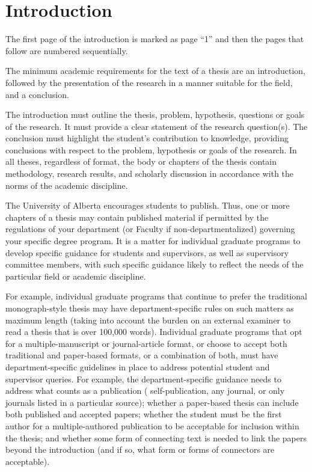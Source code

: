 
\chapter{Introduction}\label{ch:Introduction}
  The first page of the introduction is marked as page ``1'' and then the pages that follow are numbered sequentially.

  The minimum academic requirements for the text of a thesis are an introduction, followed by the presentation of the research in a manner suitable for the field, and a conclusion.

  The introduction must outline the thesis, problem, hypothesis, questions or goals of the research.
  It must provide a clear statement of the research question(s).
  The conclusion must highlight the student’s contribution to knowledge, providing conclusions with respect to the problem, hypothesis or goals of the research.
  In all theses, regardless of format, the body or chapters of the thesis contain methodology, research results, and scholarly discussion in accordance with the norms of the academic discipline.

  The University of Alberta encourages students to publish.
  Thus, one or more chapters of a thesis may contain published material if permitted by the regulations of your department (or Faculty if non-departmentalized) governing your specific degree program.
  It is a matter for individual graduate programs to develop specific guidance for students and supervisors, as well as supervisory committee members, with such specific guidance likely to reflect the needs of the particular field or academic discipline.

  For example, individual graduate programs that continue to prefer the traditional monograph-style thesis may have department-specific rules on such matters as maximum length (taking into account the burden on an external examiner to read a thesis that is over 100,000 words).
  Individual graduate programs that opt for a multiple-manuscript or journal-article format, or choose to accept both traditional and paper-based formats, or a combination of both, must have department-specific guidelines in place to address potential student and supervisor queries.
  For example, the department-specific guidance needs to address what counts as a publication ( self-publication, any journal, or only journals listed in a particular source); whether a paper-based thesis can include both published and accepted papers; whether the student must be the first author for a multiple-authored publication to be acceptable for inclusion within the thesis; and whether some form of connecting text is needed to link the papers beyond the introduction (and if so, what form or forms of connectors are acceptable).

